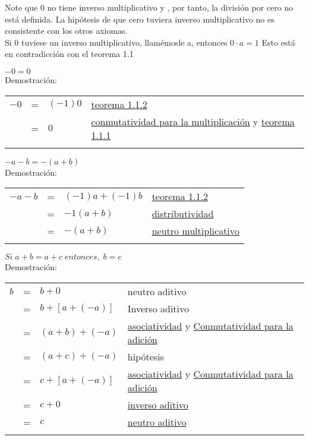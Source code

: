 Note que 0 no tiene inverso multiplicativo y , por tanto, la división por cero no está definida. La hipótesis de que cero tuviera inverso multiplicativo no es consistente con los otros axiomas.\\
Si 0 tuviese un inverso multiplicativo, llamémosle a, entonces $0\cdot a = 1$ Esto está en contradicción con el teorema 1.1


\begin{teo}
$ -0 = 0$\\ \label{teo 1.1.5}
Demostración:
\begin{center}
\begin{tabular}{r c l l}
$-0$&=&$(-1)0$&\hyperref[teo 1.1.2]{teorema 1.1.2}\\
&=&$0$&\hyperref[M2]{conmutatividad para la multiplicación} y \hyperref[teo 1.1.1]{teorema 1.1.1}\\\\
\end{tabular}
\end{center}
\end{teo}

\begin{teo}
$-a-b=-(a+b)$\\ \label{teo 1.1.6}
Demostración:
\begin{center}
\begin{tabular}{r c l l}
$-a-b$&=&$(-1)a + (-1)b$&\hyperref[teo 1.1.2]{teorema 1.1.2}\\
&=&$-1(a+b)$&\hyperref[D]{distributividad}\\
&=&$-(a+b)$&\hyperref[M4]{neutro multiplicativo}\\\\
\end{tabular}
\end{center}
\end{teo}

\begin{teo}
$ Si \; a+b=a+c \; entonces, \; b = c$\\ \label{1.1.7}
Demostración:
\begin{center}
\begin{tabular}{r c l l}
$b$&=&$b+0$&neutro aditivo\\
&=&$b+\left[a+(-a)\right]$&Inverso aditivo\\
&=&$(a+b)+(-a)$&\hyperref[A3]{asociatividad} y \hyperref[A2]{Conmutatividad para la adición}\\
&=&$(a+c)+(-a)$&hipótesis\\
&=&$c + \left[ a+(-a)  \right]$&\hyperref[A3]{asociatividad} y \hyperref[A2]{Conmutatividad para la adición}\\
&=&$c+0$&\hyperref[A5]{inverso aditivo}\\
&=&$c$&\hyperref[A4]{neutro aditivo}\\\\
\end{tabular}
\end{center}
\end{teo}

